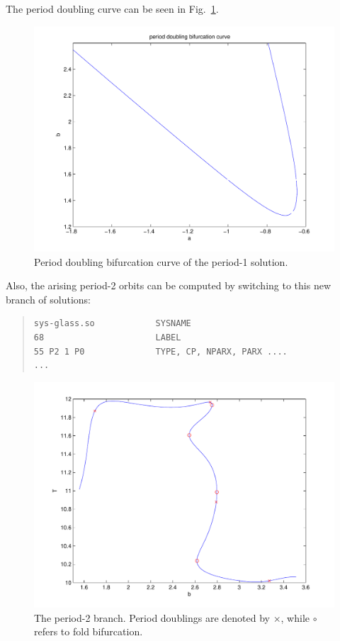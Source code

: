 \documentclass[10pt,a4paper]{ddedoc}
\begin{document}
The period doubling curve can be seen in Fig.\ \ref{pdbif}.
\begin{figure}[bth!]
\begin{center}
\includegraphics[scale=0.6]{fig/pdbif2}
\end{center}
\caption{Period doubling bifurcation curve of the period-1 solution.}
\label{pdbif}
\end{figure}
Also, the arising period-2 orbits can be computed by switching to this new
branch of solutions:
{ \small \begin{quote} \begin{lstlisting}[basicstyle=\tt,frame=single]
sys-glass.so            SYSNAME
68                      LABEL
55 P2 1 P0              TYPE, CP, NPARX, PARX ....
...
\end{lstlisting} \end{quote} } \noindent
%
\begin{figure}[bth!]
\begin{center}
\includegraphics[scale=0.6]{fig/pdsw}
\end{center}
\caption{The period-2 branch. Period doublings are denoted by $\times$, while
$\circ$ refers to fold bifurcation. }
\label{pdsw}
\end{figure}
\end{document}

